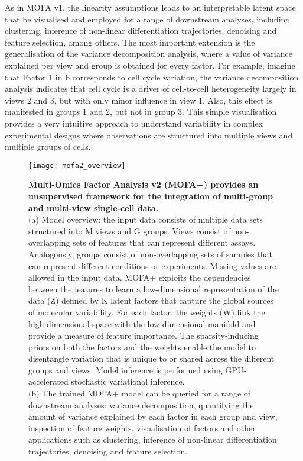 As in MOFA v1, the linearity assumptions leads to an interpretable latent space that be visualised and employed for a range of downstream analyses, including clustering, inference of non-linear differentiation trajectories, denoising and feature selection, among others. The most important extension is the generalisation of the variance decomposition analysis, where a value of variance explained per view and group is obtained for every factor. For example, imagine that Factor 1 in b corresponds to cell cycle variation, the variance decomposition analysis indicates that cell cycle is a driver of cell-to-cell heterogeneity largely in views 2 and 3, but with only minor influence in view 1. Also, this effect is manifested in groups 1 and 2, but not in group 3. This simple visualisation provides a very intuitive approach to understand variability in complex experimental designs where observations are structured into multiple views and multiple groups of cells.

\begin{figure}[H]
	\centering
	\texttt{[image: mofa2\_overview]}
	\caption[]{\textbf{Multi-Omics Factor Analysis v2 (MOFA+) provides an unsupervised framework for the integration of multi-group and multi-view single-cell data.}\\
	(a) Model overview: the input data consists of multiple data sets structured into M views and G groups. Views consist of non-overlapping sets of features that can represent different assays. Analogously, groups consist of non-overlapping sets of samples that can represent different conditions or experiments. Missing values are allowed in the input data. MOFA+ exploits the dependencies between the features to learn a low-dimensional representation of the data (Z) defined by K latent factors that capture the global sources of molecular variability. For each factor, the weights (W) link the high-dimensional space with the low-dimensional manifold and provide a measure of feature importance. The sparsity-inducing priors on both the factors and the weights enable the model to disentangle variation that is unique to or shared across the different groups and views. Model inference is performed using GPU-accelerated stochastic variational inference. \\
	(b) The trained MOFA+ model can be queried for a range of downstream analyses: variance decomposition, quantifying the amount of variance explained by each factor in each group and view, inspection of feature weights, visualisation of factors and other applications such as clustering, inference of non-linear differentiation trajectories, denoising and feature selection.
	}
	\label{fig:mofa2_overview}
\end{figure}


